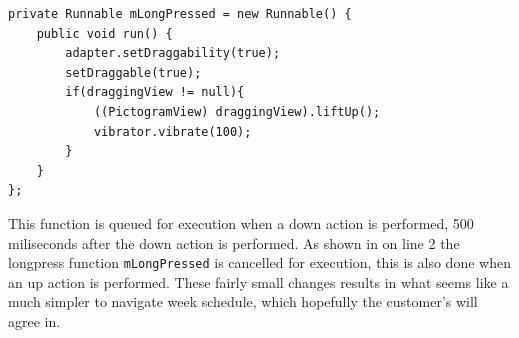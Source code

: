\begin{lstlisting}[float, floatplacement=h, caption={The long press function which is queued upon a \texttt{MotionEvent\_Down}.}, label={lst:longpress}] 
private Runnable mLongPressed = new Runnable() {
    public void run() {
        adapter.setDraggability(true);
        setDraggable(true);
        if(draggingView != null){
            ((PictogramView) draggingView).liftUp();
            vibrator.vibrate(100);
        }
    }
};
\end{lstlisting}
This function is queued for execution when a down action is performed, 500 miliseconds after the down action is performed.
As shown in  on line 2 the longpress function \texttt{mLongPressed} is cancelled for execution, this is also done when an up action is performed. 
These fairly small changes results in what seems like a much simpler to navigate week schedule, which hopefully the customer's will agree in.
